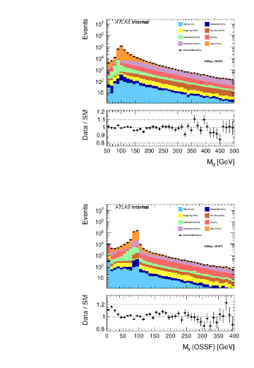 \begin{figure}
{\begin{subfigure}{.425\textwidth}
        \includegraphics[width=\textwidth]{Figures/FeaturesHistograms/mlll.pdf}
        \caption{}
        \label{fig:mlll}
    \end{subfigure}
    \hfill
    \begin{subfigure}{.425\textwidth}
        \includegraphics[width=\textwidth]{Figures/FeaturesHistograms/mll_OSSF.pdf}
        \caption{}
        \label{fig:mll_OSSF}
    \end{subfigure}
    }
\end{figure}
